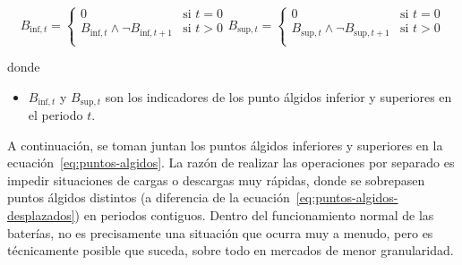 \begin{samepage}

  \begin{subequations}
    \label{eq:puntos-algidos-desplazados}

    \begin{equation}
      B_{\text{inf}, t} =
      \begin{cases}
        0                                                & \text{si } t = 0 \\
        B_{\text{inf}, t} \land \neg B_{\text{inf}, t+1} & \text{si } t > 0 \\
      \end{cases}
    \end{equation}

    \begin{equation}
      B_{\text{sup}, t} =
      \begin{cases}
        0                                                & \text{si } t = 0 \\
        B_{\text{sup}, t} \land \neg B_{\text{sup}, t+1} & \text{si } t > 0 \\
      \end{cases}
    \end{equation}

  \end{subequations}

  donde

  \begin{itemize}

    \item \( B_{\text{inf}, t} \) y \( B_{\text{sup}, t} \) son los indicadores de los punto álgidos inferior y superiores en el periodo \( t \).

  \end{itemize}

\end{samepage}

A continuación, se toman juntan los puntos álgidos inferiores y superiores en la ecuación~\ref{eq:puntos-algidos}. La razón de realizar las operaciones por separado es impedir situaciones de cargas o descargas muy rápidas, donde se sobrepasen puntos álgidos distintos (a diferencia de la ecuación~\ref{eq:puntos-algidos-desplazados}) en periodos contiguos. Dentro del funcionamiento normal de las baterías, no es precisamente una situación que ocurra muy a menudo, pero es técnicamente posible que suceda, sobre todo en mercados de menor granularidad.

